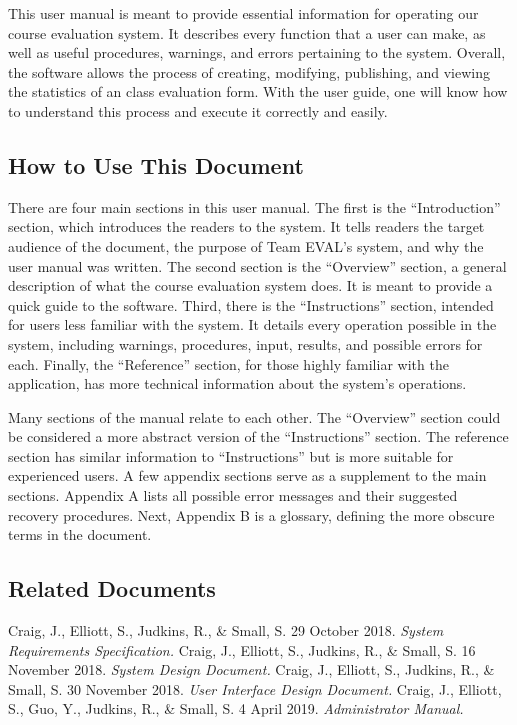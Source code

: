 \documentclass{article}
\begin{document}
This user manual is meant to provide essential information for operating our course evaluation system. It describes every function that a user can make, as well as useful procedures, warnings, and errors pertaining to the system. Overall, the software allows the process of creating, modifying, publishing, and viewing the statistics of an class evaluation form. With the user guide, one will know how to understand this process and execute it correctly and easily.

\subsection{How to Use This Document}

There are four main sections in this user manual. The first is the ``Introduction'' section, which introduces the readers to the system. It tells readers the target audience of the document, the purpose of Team EVAL's system, and why the user manual was written. The second section is the ``Overview'' section, a general description of what the course evaluation system does. It is meant to provide a quick guide to the software. Third, there is the ``Instructions'' section, intended for users less familiar with the system. It details every operation possible in the system, including warnings, procedures, input, results, and possible errors for each. Finally, the ``Reference'' section, for those highly familiar with the application, has more technical information about the system's operations.

Many sections of the manual relate to each other. The ``Overview'' section could be considered a more abstract version of the ``Instructions'' section. The reference section has similar information to ``Instructions'' but is more suitable for experienced users. A few appendix sections serve as a supplement to the main sections. Appendix A lists all possible error messages and their suggested recovery procedures. Next, Appendix B is a glossary, defining the more obscure terms in the document.

\subsection{Related Documents}

Craig, J., Elliott, S., Judkins, R., \& Small, S. 29 October 2018. \textit{System Requirements Specification.}
\vspace{3mm}\newline
Craig, J., Elliott, S., Judkins, R., \& Small, S. 16 November 2018. \textit{System Design Document.}
\vspace{3mm}\newline
Craig, J., Elliott, S., Judkins, R., \& Small, S. 30 November 2018. \textit{User Interface Design Document.}
\vspace{3mm}\newline
Craig, J., Elliott, S., Guo, Y., Judkins, R., \& Small, S. 4 April 2019. \textit{Administrator Manual.}
\end{document}
